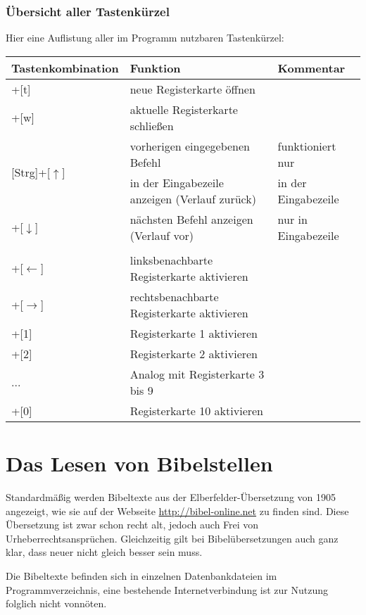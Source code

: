 \documentclass[a4paper]{scrartcl}
\begin{document}
\subsubsection{Übersicht aller Tastenkürzel}
Hier eine Auflistung aller im Programm nutzbaren Tastenkürzel:\\

\begin{tabular}{|l|l|l|}
\hline
\textbf{Tastenkombination}	& \textbf{Funktion}	& \textbf{Kommentar}	\\ \hline
[Strg]+[t]				& neue Registerkarte öffnen			&	\\ \hline
[Strg]+[w]				& aktuelle Registerkarte schließen	&	\\ \hline
\multirow{2}{*}{[Strg]+[$\uparrow$]}		& vorherigen eingegebenen Befehl &	funktioniert nur\\
						& in der Eingabezeile anzeigen (Verlauf zurück)		& in der Eingabezeile	\\ \hline
[Strg]+[$\downarrow$]	& nächsten Befehl anzeigen (Verlauf vor)	& nur in Eingabezeile	\\ \hline
						&							&	\\ \hline
[Shift]+[$\leftarrow$]	& linksbenachbarte Registerkarte aktivieren		&	\\ \hline
[Shift]+[$\rightarrow$]	& rechtsbenachbarte Registerkarte aktivieren	&	\\ \hline
[Alt]+[1]				& Registerkarte 1 aktivieren	&	\\ \hline
[Alt]+[2]				& Registerkarte 2 aktivieren	&	\\ \hline
...						& Analog mit Registerkarte 3 bis 9	&	\\ \hline
[Alt]+[0]				& Registerkarte 10 aktivieren	&	\\ \hline
\end{tabular}

\section{Das Lesen von Bibelstellen}

Standardmäßig werden Bibeltexte aus der Elberfelder-Übersetzung von 1905 angezeigt, wie sie auf der Webseite \url{http://bibel-online.net} zu finden sind.
Diese Übersetzung ist zwar schon recht alt, jedoch auch Frei von Urheberrechtsansprüchen. Gleichzeitig gilt bei Bibelübersetzungen auch ganz klar, dass neuer nicht gleich besser sein muss.

Die Bibeltexte befinden sich in einzelnen Datenbankdateien im Programmverzeichnis, eine bestehende Internetverbindung ist zur Nutzung folglich nicht vonnöten.
\end{document}
